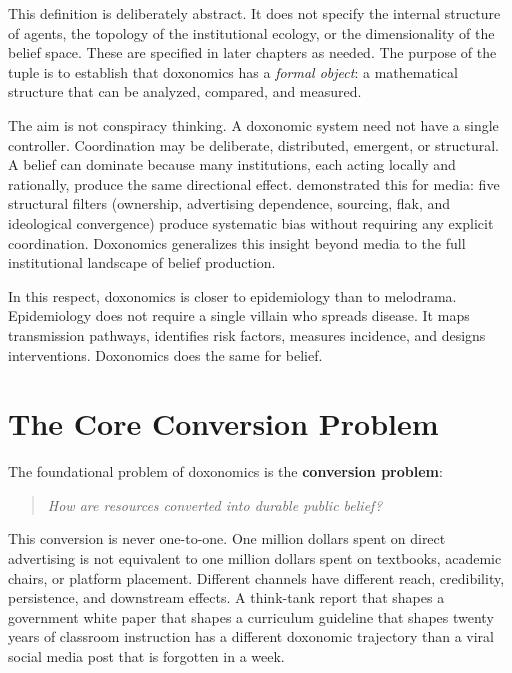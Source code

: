 \begin{remark}
This definition is deliberately abstract.
It does not specify the internal structure of agents, the topology of the institutional ecology, or the dimensionality of the belief space.
These are specified in later chapters as needed.
The purpose of the tuple is to establish that doxonomics has a \emph{formal object}: a mathematical structure that can be analyzed, compared, and measured.
\end{remark}

The aim is not conspiracy thinking.
A doxonomic system need not have a single controller.
Coordination may be deliberate, distributed, emergent, or structural.
A belief can dominate because many institutions, each acting locally and rationally, produce the same directional effect.
\textcite{herman1988} demonstrated this for media: five structural filters (ownership, advertising dependence, sourcing, flak, and ideological convergence) produce systematic bias without requiring any explicit coordination.
Doxonomics generalizes this insight beyond media to the full institutional landscape of belief production.

In this respect, doxonomics is closer to epidemiology than to melodrama.
Epidemiology does not require a single villain who spreads disease.
It maps transmission pathways, identifies risk factors, measures incidence, and designs interventions.
Doxonomics does the same for belief.


\section{The Core Conversion Problem}
\label{sec:ch1-conversion}

The foundational problem of doxonomics is the \textbf{conversion problem}:

\begin{quote}
\textit{How are resources converted into durable public belief?}
\end{quote}

This conversion is never one-to-one.
One million dollars spent on direct advertising is not equivalent to one million dollars spent on textbooks, academic chairs, or platform placement.
Different channels have different reach, credibility, persistence, and downstream effects.
A think-tank report that shapes a government white paper that shapes a curriculum guideline that shapes twenty years of classroom instruction has a different doxonomic trajectory than a viral social media post that is forgotten in a week.

